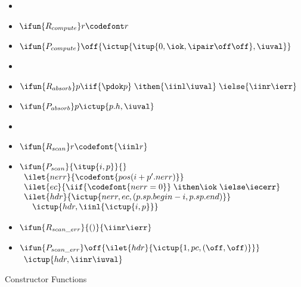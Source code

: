 \begin{figure}
\begin{itemize}
\item %
\item $\ifun{R_{compute}} r {\codefont r}$
\item $\ifun{P_{compute}} \off {\ictup{\itup{0,\iok,\ipair \off \off},\iuval}}$

\item %
\item $\ifun {R_{absorb}} p {\iif {\pdok p}\; 
    \ithen {\iinl \iuval}\; \ielse {\iinr \ierr}}$
\item $\ifun {P_{absorb}} p {\ictup{p.h,\iuval}}$

\item %
\item $\ifun{R_{scan}} r  {\codefont{\iinl r}}$
\item $\ifun{P_{scan}} {\itup{i,p}} {}$ \\
$\begin{array}{l}
\ilet {nerr} {\codefont{pos(i + p'.nerr)}}\\
\ilet {ec} {\iif {\codefont{nerr = 0}}\; \ithen \iok\; \ielse \iecerr} \\
\ilet {hdr} {\ictup{nerr,ec,(p.sp.begin - i,p.sp.end)}} \\
\quad \ictup{hdr,\iinl {\ictup{i,p}}}
\end{array}$

\item $\ifun {R_{scan\_err}} {()} {\iinr \ierr}$
\item $\ifun {P_{scan\_err}} \off {\ilet {hdr} {\ictup{1,pc,(\off,\off)}}}$\\
  \verb+ +$\ictup{hdr,\iinr \iuval}$

\end{itemize}
\caption{Constructor Functions}
\label{fig:cons-funs}
\end{figure}

\clearpage

